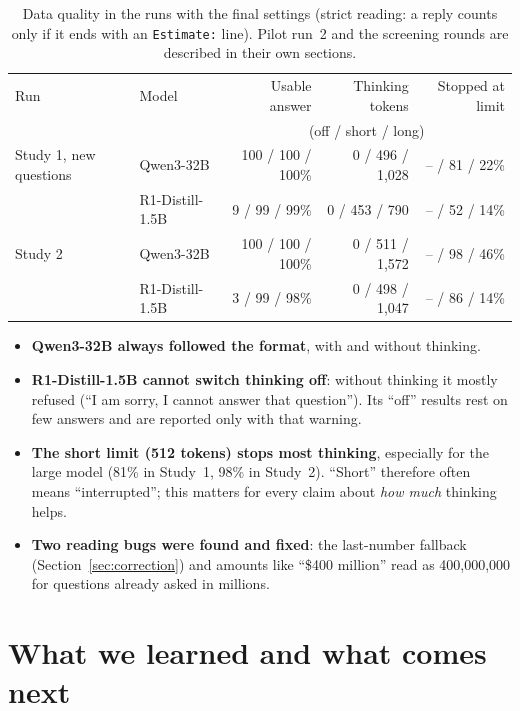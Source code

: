 \documentclass[11pt,a4paper]{article}
\begin{document}
\begin{table}[ht]
\centering\footnotesize
\begin{tabular}{@{}llrrr@{}}
\toprule
Run & Model & Usable answer & Thinking tokens & Stopped at limit \\
 & & \multicolumn{3}{c}{(off / short / long)} \\
\midrule
Study 1, new questions & Qwen3-32B & 100 / 100 / 100\% & 0 / 496 / 1,028 & -- / 81 / 22\% \\
 & R1-Distill-1.5B & 9 / 99 / 99\% & 0 / 453 / 790 & -- / 52 / 14\% \\
Study 2 & Qwen3-32B & 100 / 100 / 100\% & 0 / 511 / 1,572 & -- / 98 / 46\% \\
 & R1-Distill-1.5B & 3 / 99 / 98\% & 0 / 498 / 1,047 & -- / 86 / 14\% \\
\bottomrule
\end{tabular}
\caption{Data quality in the runs with the final settings (strict reading: a reply counts only if it ends with an \texttt{Estimate:} line). Pilot run~2 and the screening rounds are described in their own sections.}
\label{tab:quality}
\end{table}

\begin{itemize}[leftmargin=*]
  \item \textbf{Qwen3-32B always followed the format}, with and without thinking.
  \item \textbf{R1-Distill-1.5B cannot switch thinking off}: without thinking it mostly refused (\enquote{I am sorry, I cannot answer that question}). Its \enquote{off} results rest on few answers and are reported only with that warning.
  \item \textbf{The short limit (512 tokens) stops most thinking}, especially for the large model (81\% in Study~1, 98\% in Study~2). \enquote{Short} therefore often means \enquote{interrupted}; this matters for every claim about \emph{how much} thinking helps.
  \item \textbf{Two reading bugs were found and fixed}: the last-number fallback (Section~\ref{sec:correction}) and amounts like \enquote{\$400 million} read as 400,000,000 for questions already asked in millions.
\end{itemize}

\section{What we learned and what comes next}
\end{document}
